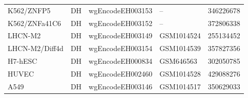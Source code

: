 \begin{longtable}{p{3.5cm}p{1.2cm}p{3.7cm}p{2.5cm}p{2.8cm}}
K562/ZNFP5 & DH & wgEncodeEH003153 & -- & 346226678 \\
K562/ZNFa41C6 & DH & wgEncodeEH003152 & -- & 372806338 \\
LHCN-M2 & DH & wgEncodeEH003149 & GSM1014524 & 255134452 \\
LHCN-M2/Diff4d & DH & wgEncodeEH003154 & GSM1014539 & 357827356 \\
H7-hESC & DH & wgEncodeEH000834 & GSM646563 & 302050785 \\
HUVEC & DH & wgEncodeEH002460 & GSM1014528 & 429088276 \\
A549 & DH & wgEncodeEH003146 & GSM1014517 & 350629033 \\
\hline
\end{longtable}

\clearpage

